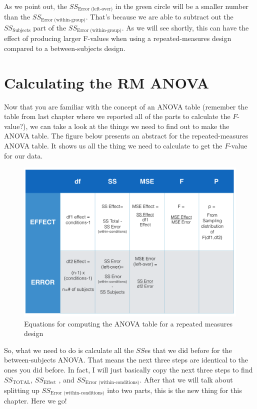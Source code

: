\documentclass[
]{book}
\begin{document}
As we point out, the \(SS_\text{Error (left-over)}\) in the green circle will be a smaller number than the \(SS_\text{Error (within-group)}\). That's because we are able to subtract out the \(SS_\text{Subjects}\) part of the \(SS_\text{Error (within-group)}\). As we will see shortly, this can have the effect of producing larger F-values when using a repeated-measures design compared to a between-subjects design.

\hypertarget{calculating-the-rm-anova}{%
\section{Calculating the RM ANOVA}\label{calculating-the-rm-anova}}

Now that you are familiar with the concept of an ANOVA table (remember the table from last chapter where we reported all of the parts to calculate the \(F\)-value?), we can take a look at the things we need to find out to make the ANOVA table. The figure below presents an abstract for the repeated-measures ANOVA table. It shows us all the thing we need to calculate to get the \(F\)-value for our data.

\begin{figure}
\centering
\includegraphics{figures/RMANOVA_table.png}
\caption{\label{fig:8rmtable}Equations for computing the ANOVA table for a repeated measures design}
\end{figure}

So, what we need to do is calculate all the \(SS\)es that we did before for the between-subjects ANOVA. That means the next three steps are identical to the ones you did before. In fact, I will just basically copy the next three steps to find \(SS_\text{TOTAL}\), \(SS_\text{Effect}\) , and \(SS_\text{Error (within-conditions)}\). After that we will talk about splitting up \(SS_\text{Error (within-conditions)}\) into two parts, this is the new thing for this chapter. Here we go!
\end{document}
